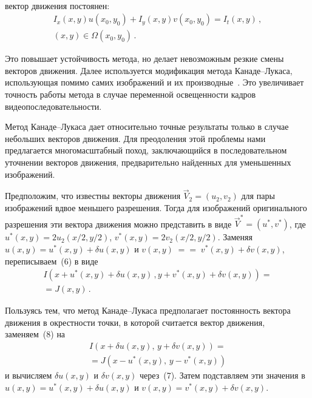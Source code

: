 \begin{figure*} %
\vspace*{1pt}
\begin{center}
\mbox{%
\epsfxsize=158.307mm
}
\end{center}
\vspace*{-6pt}
\vspace*{3pt}
\end{figure*}

\begin{multicols}{2}

\noindent
вектор движения постоянен:
\begin{multline}
I_x(x,y) u(x_0,y_0)+I_y(x,y)v(x_0,y_0)=I_t(x,y)\,,\\
(x,y)\in \Omega(x_0,y_0)\,.
\label{e8nas}
\end{multline}

     Это повышает устойчивость метода, но делает невозможным резкие смены
векторов движения. Далее используется модификация метода Канаде--Лукаса,
использующая помимо самих изображений и их производные~\cite{17nas}. Это
увеличивает точность работы метода в случае переменной освещенности кадров
видеопоследовательности.

     Метод Канаде--Лукаса дает относительно точные результаты только в случае
небольших векторов движения. Для преодоления этой проблемы нами предлагается
многомасштабный поход, заключающийся в последовательном уточнении векторов
движения, предварительно найденных для уменьшенных изображений.

     Предположим, что известны векторы движения $\vec{V}_2=(u_2,v_2)$ для пары
изображений вдвое меньшего разрешения. Тогда для изображений оригинального
разрешения эти вектора движения можно представить в виде $\vec{V}^*=(u^*,v^*)$,
где $u^*(x,y)=2u_2(x/2,y/2)$, $v^*(x,y)=2v_2(x/2,y/2)$. Заменяя $u(x,y)=u^*(x,y)+\delta
u(x,y)$ и $v(x,y)\;=$\linebreak $=\;v^*(x,y)+\delta v(x,y)$, переписываем~(6) в виде
     \begin{multline}
     I(x+u^*(x,y)+\delta u(x,y)\,,y+v^*(x,y)+\delta v(x,y)) ={}\\
     {}= J(x,y)\,.
     \label{e9nas}
     \end{multline}

     Пользуясь тем, что метод Канаде--Лукаса предполагает постоянность вектора
движения в окрестности точки, в которой считается вектор движения, заменяем~(8) на
     \begin{multline*}
     I(x+\delta u(x,y),\,y+\delta v(x,y)) = {}\\
     {}=J(x-u^*(x,y),\,y-v^*(x,y))
     \end{multline*}
и вычисляем $\delta u(x,y)$ и $\delta v(x,y)$ через~(7). Затем под\-став\-ля\-ем эти значения в
$u(x,y) =u^*(x,y)+\delta u(x,y)$ и $v(x,y) = v^*(x,y)+\delta v(x,y)$.


\end{multicols}
